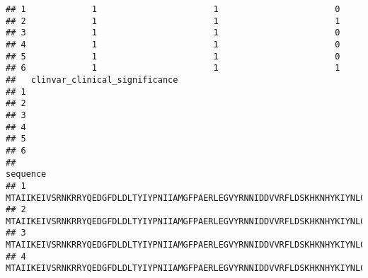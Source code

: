 \documentclass[
]{article}
\begin{document}
\begin{verbatim}
## 1             1                       1                       0
## 2             1                       1                       1
## 3             1                       1                       0
## 4             1                       1                       0
## 5             1                       1                       0
## 6             1                       1                       1
##   clinvar_clinical_significance
## 1                              
## 2                              
## 3                              
## 4                              
## 5                              
## 6                              
##                                                                                                                                                                                                                                                                                                                                                                                                              sequence
## 1 MTAIIKEIVSRNKRRYQEDGFDLDLTYIYPNIIAMGFPAERLEGVYRNNIDDVVRFLDSKHKNHYKIYNLCAERHYDTAKFNCRVAQYPFEDHNPPQLELIKPFCEDLDQWLSEDDNHVAAIHCKAGKGRTGVMICAYLLHRGKFLKAQEALDFYGEVRTRDKKGVTIPSQRRYVYYYSYLLKNHLDYRPVALLFHKMMFETIPMFSGGTCNPQFVVCQLKVKIYSSNSGPTRREDKFMYFEFPQPLPVCGDIKVEFFHKQNKMLKKDKMFHFWVNTFFIPGPEETSEKVENGSLCDQEIDSICSIERADNDKEYLVLTLTKNDLDKANKDKANRYFSPNFKVKLYFTKTVEEPSNPEASSSTSVTPDVSDNEPDHYRYSDTTDSDPENEPFDEDQHTQITKV
## 2 MTAIIKEIVSRNKRRYQEDGFDLDLTYIYPNIIAMGFPAERLEGVYRNNIDDVVRFLDSKHKNHYKIYNLCAERHYDTAKFNCRVAQYPFEDHNPPQLELIKPFCEDLDQWLSEDDNHVAAIHCKAGKGRTGVMICAYLLHRGKFLKAQEALDFYGEVRTRDKKGVTIPSQRRYVYYYSYLLKNHLDYRPVALLFHKMMFETIPMFSGGTCNPQFVVCQLKVKIYSSNSGPTRREDKFMYFEFPQPLPVCGDIKVEFFHKQNKMLKKDKMFHFWVNTFFIPGPEETSEKVENGSLCDQEIDSICSIERADNDKEYLVLTLTKNDLDKANKDKANRYFSPNFKVKLYFTKTVEEPSNPEASSSTSVTPDVSDNEPDHYRYSDTTDSDPENEPFDEDQHTQITKV
## 3 MTAIIKEIVSRNKRRYQEDGFDLDLTYIYPNIIAMGFPAERLEGVYRNNIDDVVRFLDSKHKNHYKIYNLCAERHYDTAKFNCRVAQYPFEDHNPPQLELIKPFCEDLDQWLSEDDNHVAAIHCKAGKGRTGVMICAYLLHRGKFLKAQEALDFYGEVRTRDKKGVTIPSQRRYVYYYSYLLKNHLDYRPVALLFHKMMFETIPMFSGGTCNPQFVVCQLKVKIYSSNSGPTRREDKFMYFEFPQPLPVCGDIKVEFFHKQNKMLKKDKMFHFWVNTFFIPGPEETSEKVENGSLCDQEIDSICSIERADNDKEYLVLTLTKNDLDKANKDKANRYFSPNFKVKLYFTKTVEEPSNPEASSSTSVTPDVSDNEPDHYRYSDTTDSDPENEPFDEDQHTQITKV
## 4 MTAIIKEIVSRNKRRYQEDGFDLDLTYIYPNIIAMGFPAERLEGVYRNNIDDVVRFLDSKHKNHYKIYNLCAERHYDTAKFNCRVAQYPFEDHNPPQLELIKPFCEDLDQWLSEDDNHVAAIHCKAGKGRTGVMICAYLLHRGKFLKAQEALDFYGEVRTRDKKGVTIPSQRRYVYYYSYLLKNHLDYRPVALLFHKMMFETIPMFSGGTCNPQFVVCQLKVKIYSSNSGPTRREDKFMYFEFPQPLPVCGDIKVEFFHKQNKMLKKDKMFHFWVNTFFIPGPEETSEKVENGSLCDQEIDSICSIERADNDKEYLVLTLTKNDLDKANKDKANRYFSPNFKVKLYFTKTVEEPSNPEASSSTSVTPDVSDNEPDHYRYSDTTDSDPENEPFDEDQHTQITKV

\end{verbatim}
\end{document}
